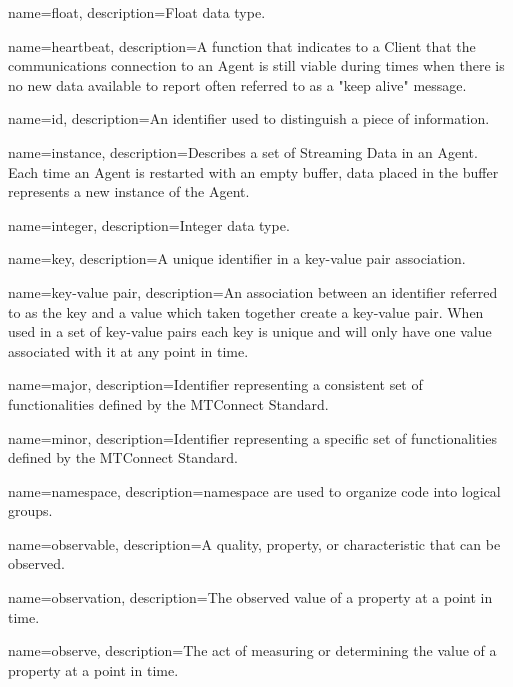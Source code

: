 {
    name={float},
	description={Float data type.}
}

{
    name={heartbeat},
	description={A function that indicates to a \gls{Client} that the communications connection to an \gls{Agent} is still viable during times when there is no new data available to report  often referred to as a "keep alive" message.}
}

{
    name={id},
	description={An identifier used to distinguish a piece of information.}
}

{
    name={instance},
	description={Describes a set of \gls{Streaming Data} in an \gls{Agent}.  Each time an \gls{Agent} is restarted with an empty \gls{buffer}, data placed in the \gls{buffer} represents a new \gls{instance} of the \gls{Agent}.}
}

{
    name={integer},
	description={Integer data type.}
}

{
    name={key},
	description={A unique identifier in a \gls{key-value pair} association.}
}

{
    name={key-value pair},
	description={An association between an identifier referred to as the \gls{key} and a value which taken together create a \gls{key-value pair}. When used in a set of \glspl{key-value pair} each \gls{key} is unique and will only have one value associated with it at any point in time.}
}

{
    name={major},
	description={Identifier representing a consistent set of functionalities defined by the MTConnect Standard.}
}

{
    name={minor},
	description={Identifier representing a specific set of functionalities defined by the MTConnect Standard.}
}

{
    name={namespace},
	description={\gls{namespace} are used to organize code into logical groups.}
}

{
    name={observable},
	description={A quality, property, or characteristic that can be observed.}
}

{
    name={observation},
	description={The observed value of a property at a point in time.}
}

{
    name={observe},
	description={The act of measuring or determining the value of a property at a point in time.}
}


